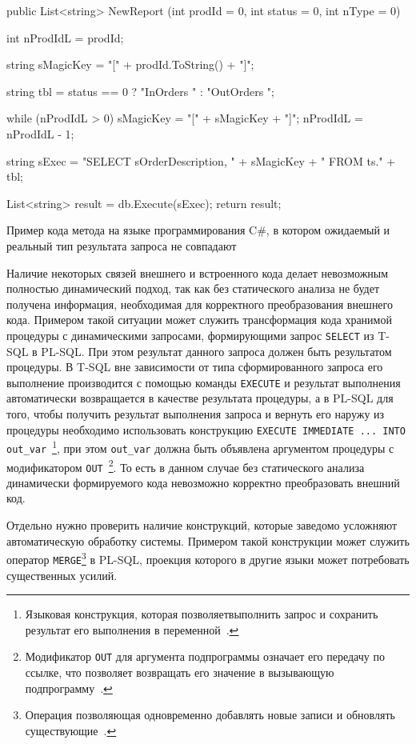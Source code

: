 \begin{enumerate}
\begin{listing}
\begin{pyglist}[language=csharp,numbers=left,numbersep=5pt]
public List<string> NewReport
  (int prodId = 0, int status = 0, int nType = 0)
{
    int nProdIdL = prodId;

    string sMagicKey = "[" + prodId.ToString() + "]";

    string tbl = status == 0 ? "InOrders " : "OutOrders ";

    while (nProdIdL > 0)
    {
        sMagicKey = "[" + sMagicKey + "]";
        nProdIdL = nProdIdL - 1;
    }

    string sExec =
        "SELECT sOrderDescription, " + sMagicKey
        + " FROM ts." + tbl;

    List<string> result = db.Execute(sExec);
    return result;
}
\end{pyglist}
\caption{Пример кода метода на языке программирования C\#, в котором ожидаемый и реальный тип результата запроса не совпадают}
\label{lst:typeChecking}
\end{listing}

  Наличие некоторых связей внешнего и встроенного кода делает невозможным полностью динамический подход, так как без статического анализа не будет получена информация, необходимая для корректного преобразования внешнего кода. Примером такой ситуации может служить трансформация кода хранимой процедуры с динамическими запросами, формирующими запрос \verb|SELECT| из T-SQL в PL-SQL. При этом результат данного запроса должен быть результатом процедуры. В T-SQL вне зависимости от типа сформированного запроса его выполнение производится с помощью команды \verb|EXECUTE| и результат выполнения автоматически возвращается в качестве результата процедуры, а в PL-SQL для того, чтобы получить результат выполнения запроса и вернуть его наружу из процедуры необходимо использовать конструкцию \verb|EXECUTE IMMEDIATE ... INTO out_var|~\footnote{Языковая конструкция, которая позволяетвыполнить запрос и сохранить результат его выполнения в переменной~\cite{PLExecute}.}, при этом \verb|out_var| должна быть объявлена аргументом процедуры с модификатором \verb|OUT|~\footnote{Модификатор \texttt{OUT} для аргумента подпрограммы означает его передачу по ссылке, что позволяет возвращать его значение в вызывающую подпрограмму~\cite{PLProc}.}. То есть в данном случае без статического анализа динамически формируемого кода невозможно корректно преобразовать внешний код.

  Отдельно нужно проверить наличие конструкций, которые заведомо усложняют автоматическую обработку системы. Примером такой конструкции может служить оператор \verb|MERGE|\footnote{Операция позволяющая одновременно добавлять новые записи и обновлять существующие~\cite{PLMerge}.} в PL-SQL, проекция которого в другие языки может потребовать существенных усилий.
  

\end{enumerate}
